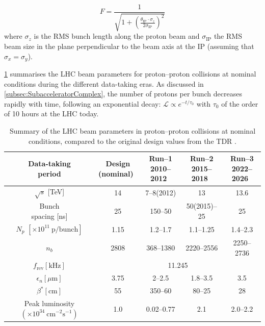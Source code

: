 \begin{equation}
    F=\frac{1}{\sqrt{1+\left( \frac{\theta_{\textrm{IP}}\cdot\sigma_z}{2\sigma_{\textrm{IP}}} \right)^2}}
    \label{eq:FactorF}
\end{equation}
where $\sigma_z$ is the RMS bunch length along the proton beam and $\sigma_{\textrm{IP}}$ the RMS beam size in the plane perpendicular to the beam axis at the IP (assuming that $\sigma_x=\sigma_y$).

\vspace{0.5 cm}

\cref{tab:LHCnumbers} summarises the LHC beam parameters for proton--proton collisions at nominal conditions during the different data-taking eras. As discussed in \cref{subsec:SubacceleratorComplex}, the number of protons per bunch decreases rapidly with time, following an exponential decay: $\mathscr{L}\propto e^{-t/\tau_0}$ with $\tau_0$ of the order of 10 hours at the LHC today.

\begin{table}[h!]
    \centering
    \small
    \renewcommand{\arraystretch}{1.4}
    \begin{tabular}{|c|c|c|c|c|}
        \hline
        \makecell{Data-taking \\ period} & \makecell{Design \\ (nominal)~\cite{EvansBryant2008}} & \makecell{Run--1 \\ 2010--2012~\cite{LHCinfoRun1} }& \makecell{Run--2 \\ 2015--2018~\cite{LHCinfoRun2}} & \makecell{Run--3 \\ 2022--2026~\cite{LHCinfoRun3}} \\ \hline \hline
        $\sqrt{s}$ [TeV] & 14 & 7--8(2012) & 13 & 13.6 \\ \hline
        \makecell{Bunch \\ spacing [ns]} & 25 & 150--50 & 50(2015)--25 & 25 \\ \hline
        \makecell{$N_p$ \\ $[\times 10^{11}\ \textrm{p/bunch}]$} & 1.15 & 1.2--1.7 & 1.1--1.25 & 1.4--2.3 \\ \hline
        $n_b$ & 2808 & 368--1380 & 2220--2556 & 2250--2736 \\ \hline
        $f_{\textrm{rev}}[\textrm{kHz}]$ & \multicolumn{4}{c|}{11.245} \\ \hline
        $\epsilon_n [\mu\textrm{m}]$ & 3.75 & 2--2.5 & 1.8--3.5 & 3.5 \\ \hline
        $\beta^{*} [\textrm{cm}]$ & 55 & 350--60 & 80--25 & 28 \\ \hline
        \makecell{Peak luminosity \\ $(\times 10^{34}\ \textrm{cm}^{-2}\textrm{s}^{-1})$} & 1.0 & 0.02--0.77 & 2.1 & 2.0--2.2 \\
        \hline
    \end{tabular}
    \caption{Summary of the LHC beam parameters in proton--proton collisions at nominal conditions, compared to the original design values from the TDR \cite{EvansBryant2008}.}
    \label{tab:LHCnumbers}
\end{table}

